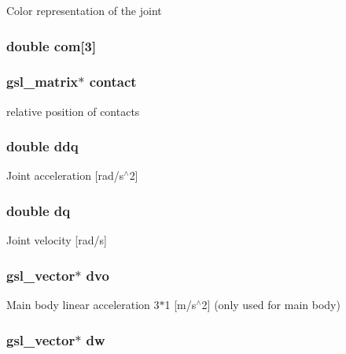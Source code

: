 Color representation of the joint \hypertarget{struct_stu_l_i_n_k_a9659866c7533736433d4391b17f5501b}{
\subsubsection[{com}]{\setlength{\rightskip}{0pt plus 5cm}double com\mbox{[}3\mbox{]}}}\label{struct_stu_l_i_n_k_a9659866c7533736433d4391b17f5501b}
\hypertarget{struct_stu_l_i_n_k_abe10827abb6a597859be5a17e7cbc8c4}{
\subsubsection[{contact}]{\setlength{\rightskip}{0pt plus 5cm}gsl\-\_\-matrix$\ast$ contact}}\label{struct_stu_l_i_n_k_abe10827abb6a597859be5a17e7cbc8c4}
relative position of contacts \hypertarget{struct_stu_l_i_n_k_a63253863f0cf910e3b007c37de0e5ffd}{
\subsubsection[{ddq}]{\setlength{\rightskip}{0pt plus 5cm}double ddq}}\label{struct_stu_l_i_n_k_a63253863f0cf910e3b007c37de0e5ffd}
Joint acceleration \mbox{[}rad/s$^\wedge$2\mbox{]} \hypertarget{struct_stu_l_i_n_k_a7f417372d0026193269f02c43323b5b8}{
\subsubsection[{dq}]{\setlength{\rightskip}{0pt plus 5cm}double dq}}\label{struct_stu_l_i_n_k_a7f417372d0026193269f02c43323b5b8}
Joint velocity \mbox{[}rad/s\mbox{]} \hypertarget{struct_stu_l_i_n_k_a8656076f5f82f1d007f76e569b4d610b}{
\subsubsection[{dvo}]{\setlength{\rightskip}{0pt plus 5cm}gsl\-\_\-vector$\ast$ dvo}}\label{struct_stu_l_i_n_k_a8656076f5f82f1d007f76e569b4d610b}
Main body linear acceleration 3$\ast$1 \mbox{[}m/s$^\wedge$2\mbox{]} (only used for main body) \hypertarget{struct_stu_l_i_n_k_a007064d4045df2e08a468f625f48134e}{
\subsubsection[{dw}]{\setlength{\rightskip}{0pt plus 5cm}gsl\-\_\-vector$\ast$ dw}}\label{struct_stu_l_i_n_k_a007064d4045df2e08a468f625f48134e}
